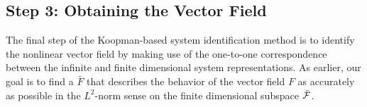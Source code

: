 \subsection{Step 3: Obtaining the Vector Field} \label{sec:step3}

The final step of the Koopman-based system identification method is to identify the nonlinear vector field by making use of the one-to-one correspondence between the infinite and finite dimensional system representations.
As earlier, our goal is to find a $\bar{F}$ that describes the behavior of the vector field $F$ as accurately as possible in the $L^2$-norm sense on the finite dimensional subspace $\bar{\mathcal{F}}$.





